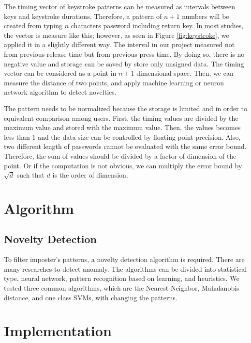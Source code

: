 \documentclass[twocolumn,showpacs,%
  nofootinbib,aps,%
  eqsecnum,prd,notitlepage,showkeys,10pt]{revtex4-1}
\begin{document}
The timing vector of keystroke patterns can be measured as intervals between keys and keystroke durations\cite{cho2000web}. Therefore, a pattern of $n+1$ numbers will be created from typing $n$ characters password including return key. In most studies, the vector is measure like this; however, as seen in Figure \ref{fig:keystroke}, we applied it in a slightly different way. The interval in our project measured not from previous release time but from previous press time. By doing so, there is no negative value and storage can be saved by store only unsigned data. The timing vector can be considered as a point in $n+1$ dimensional space. Then, we can measure the distance of two points, and apply machine learning or neuron network algorithm to detect novelties.
\par
The pattern needs to be normalized because the storage is limited and in order to equivalent comparison among users. First, the timing values are divided by the maximum value and stored with the maximum value. Then, the values becomes less than 1 and the data size can be controlled by floating point precision. Also, two different length of passwords cannot be evaluated with the same error bound. Therefore, the sum of values should be divided by a factor of dimension of the point. Or if the computation is not obvious, we can multiply the error bound by $\sqrt{d}$ such that $d$ is the order of dimension.

\section{Algorithm}
\subsection{Novelty Detection}
To filter imposter's patterns, a novelty detection algorithm is required. There are many researches to detect anomaly. The algorithms can be divided into statistical type, neural network, pattern recognition based on learning, and heuristics\cite{banerjee2012biometric}. We tested three common algorithms, which are the Nearest Neighbor, Mahalanobis distance, and one class SVMs, with changing the patterns.

\section{Implementation}
\end{document}
